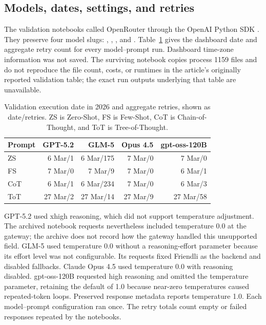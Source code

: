 \documentclass[a4paper,11pt]{article}
\begin{document}
\subsection{Models, dates, settings, and retries}

The validation notebooks called OpenRouter \citep{openRouter2026homepage} through the OpenAI Python SDK \citep{openAiPython2026GitHub}. They preserve four model slugs:  \citep{gpt52},  \citep{DBLP:journals/corr/abs-2602-15763},  \citep{opus45Card}, and  \citep{DBLP:journals/corr/abs-2508-10925}. Table~\ref{tab:validationRuns} gives the dashboard date and aggregate retry count for every model--prompt run. Dashboard time-zone information was not saved. The surviving notebook copies process \num{1159} files and do not reproduce the file count, costs, or runtimes in the article's originally reported validation table; the exact run outputs underlying that table are unavailable.

\begin{table}[H]
    \centering
    \small
    \caption{Validation execution date in 2026 and aggregate retries, shown as date/retries. ZS is Zero-Shot, FS is Few-Shot, CoT is Chain-of-Thought, and ToT is Tree-of-Thought.}
    \label{tab:validationRuns}
    \begin{tabular}{lrrrr}
        \hline
        \textbf{Prompt} & \textbf{GPT-5.2} & \textbf{GLM-5} & \textbf{Opus 4.5} & \textbf{gpt-oss-120B} \\
        \hline
        ZS  & 6 Mar/1  & 6 Mar/175 & 7 Mar/0 & 7 Mar/0 \\
        FS  & 7 Mar/0  & 7 Mar/9   & 7 Mar/0 & 6 Mar/1 \\
        CoT & 6 Mar/1  & 6 Mar/234 & 7 Mar/0 & 6 Mar/3 \\
        ToT & 27 Mar/2 & 27 Mar/14 & 27 Mar/9 & 27 Mar/58 \\
        \hline
    \end{tabular}
\end{table}

GPT-5.2 used xhigh reasoning, which did not support temperature adjustment. The archived notebook requests nevertheless included temperature \num{0.0} at the gateway; the archive does not record how the gateway handled this unsupported field. GLM-5 used temperature \num{0.0} without a reasoning-effort parameter because its effort level was not configurable. Its requests fixed Friendli as the backend and disabled fallbacks. Claude Opus 4.5 used temperature \num{0.0} with reasoning disabled. gpt-oss-120B requested high reasoning and omitted the temperature parameter, retaining the default of \num{1.0} because near-zero temperatures caused repeated-token loops. Preserved response metadata reports temperature \num{1.0}. Each model--prompt configuration ran once. The retry totals count empty or failed responses repeated by the notebooks.
\end{document}
